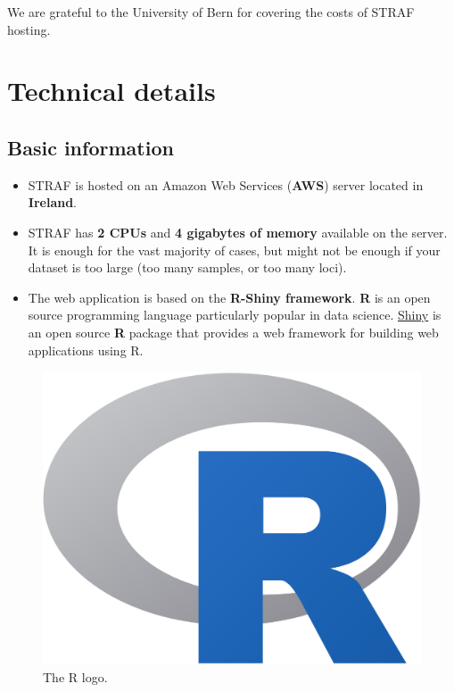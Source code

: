 \documentclass[
]{book}
\begin{document}
We are grateful to the University of Bern for covering the costs of STRAF hosting.

\hypertarget{appendix-appendix}{%
\appendix}


\hypertarget{technical-details}{%
\chapter{Technical details}\label{technical-details}}

\hypertarget{basic-information}{%
\section{Basic information}\label{basic-information}}

\begin{itemize}
\item
  STRAF is hosted on an Amazon Web Services (\textbf{AWS}) server located in \textbf{Ireland}.
\item
  STRAF has \textbf{2 CPUs} and \textbf{4 gigabytes of memory} available on the server. It is
  enough for the vast majority of cases, but might not be enough if your dataset
  is too large (too many samples, or too many loci).
\item
  The web application is based on the \textbf{R-Shiny framework}. \textbf{R} is an open source
  programming language particularly popular in data science. \href{https://www.rstudio.com/products/shiny/}{Shiny} is an
  open source \textbf{R} package that provides a web framework for building web
  applications using R.
\end{itemize}

\begin{figure}
\includegraphics[width=1\linewidth]{img/r-logo} \caption{The R logo.}\label{fig:r-logo}
\end{figure}
\end{document}
